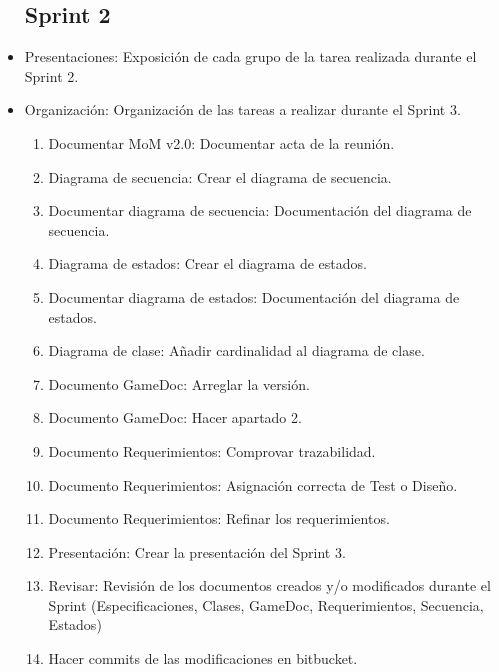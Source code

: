 \begin{itemize}
\subsection{Sprint 2}
\item Presentaciones: Exposición de cada grupo de la tarea realizada durante el Sprint 2.
\item Organización: Organización de las tareas a realizar durante el Sprint 3.
\begin{enumerate}
	\item Documentar MoM v2.0: Documentar acta de la reunión.
	\item Diagrama de secuencia: Crear el diagrama de secuencia.
	\item Documentar diagrama de secuencia: Documentación del diagrama de secuencia.
	\item Diagrama de estados: Crear el diagrama de estados.
	\item Documentar diagrama de estados: Documentación del diagrama de estados.
	\item Diagrama de clase: Añadir cardinalidad al diagrama de clase.
	\item Documento GameDoc: Arreglar la versión.
	\item Documento GameDoc: Hacer apartado 2.
	\item Documento Requerimientos: Comprovar trazabilidad.
	\item Documento Requerimientos: Asignación correcta de Test o Diseño.
	\item Documento Requerimientos: Refinar los requerimientos.
	\item Presentación: Crear la presentación del Sprint 3.
	\item Revisar: Revisión de los documentos creados y/o modificados durante el Sprint (Especificaciones, Clases, GameDoc, Requerimientos, Secuencia, Estados)
	\item Hacer commits de las modificaciones en bitbucket.
\end{enumerate}




\end{itemize}
